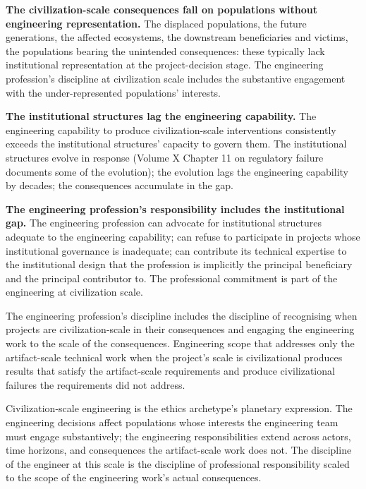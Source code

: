 \textbf{The civilization-scale consequences fall on populations without engineering representation.} The displaced populations, the future generations, the affected ecosystems, the downstream beneficiaries and victims, the populations bearing the unintended consequences: these typically lack institutional representation at the project-decision stage. The engineering profession's discipline at civilization scale includes the substantive engagement with the under-represented populations' interests.

\textbf{The institutional structures lag the engineering capability.} The engineering capability to produce civilization-scale interventions consistently exceeds the institutional structures' capacity to govern them. The institutional structures evolve in response (Volume X Chapter 11 on regulatory failure documents some of the evolution); the evolution lags the engineering capability by decades; the consequences accumulate in the gap.

\textbf{The engineering profession's responsibility includes the institutional gap.} The engineering profession can advocate for institutional structures adequate to the engineering capability; can refuse to participate in projects whose institutional governance is inadequate; can contribute its technical expertise to the institutional design that the profession is implicitly the principal beneficiary and the principal contributor to. The professional commitment is part of the engineering at civilization scale.

\begin{principle}
The engineering profession's discipline includes the discipline of recognising when projects are civilization-scale in their consequences and engaging the engineering work to the scale of the consequences. Engineering scope that addresses only the artifact-scale technical work when the project's scale is civilizational produces results that satisfy the artifact-scale requirements and produce civilizational failures the requirements did not address.
\end{principle}

\begin{archetype}[ethics]
Civilization-scale engineering is the ethics archetype's planetary expression. The engineering decisions affect populations whose interests the engineering team must engage substantively; the engineering responsibilities extend across actors, time horizons, and consequences the artifact-scale work does not. The discipline of the engineer at this scale is the discipline of professional responsibility scaled to the scope of the engineering work's actual consequences.
\end{archetype}

